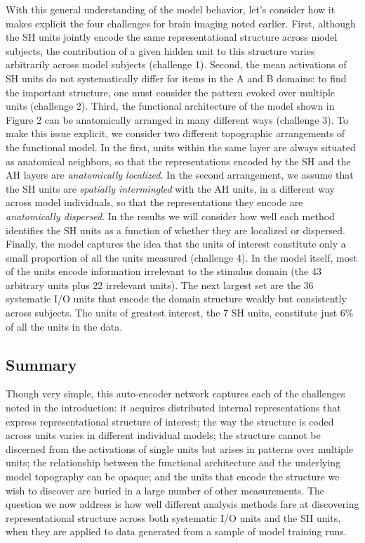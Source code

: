 With this general understanding of the model behavior, let's consider how it makes explicit the four challenges for brain imaging noted earlier. First, although the SH units jointly encode the same representational structure across model subjects, the contribution of a given hidden unit to this structure varies arbitrarily across model subjects (challenge 1). Second, the mean activations of SH units do not systematically differ for items in the A and B domains: to find the important structure, one must consider the pattern evoked over multiple units (challenge 2). Third, the functional architecture of the model shown in Figure 2 can be anatomically arranged in many different ways (challenge 3). To make this issue explicit, we consider two different topographic arrangements of the functional model. In the first, units within the same layer are always situated as anatomical neighbors, so that the representations encoded by the SH and the AH layers are {\em anatomically localized}. In the second arrangement, we assume that the SH units are {\em spatially intermingled} with the AH units, in a different way across model individuals, so that the representations they encode are {\em anatomically dispersed}. In the results we will consider how well each method identifies the SH units as a function of whether they are localized or dispersed. Finally, the model captures the idea that the units of interest constitute only a small proportion of all the units measured (challenge 4). In the model itself, most of the units encode information irrelevant to the stimulus domain (the 43 arbitrary units plus 22 irrelevant units). The next largest set are the 36 systematic I/O units that encode the domain structure weakly but consistently across subjects. The units of greatest interest, the 7 SH units, constitute just 6\% of all the units in the data. 

\subsection{Summary} 

Though very simple, this auto-encoder network captures each of the challenges noted in the introduction: it acquires distributed internal representations that express representational structure of interest; the way the structure is coded across units varies in different individual models; the structure cannot be discerned from the activations of single units but arises in patterns over multiple units; the relationship between the functional architecture and the underlying model topography can be opaque; and the units that encode the structure we wish to discover are buried in a large number of other measurements. The question we now address is how well different analysis methods fare at discovering representational structure across both systematic I/O units and the SH units, when they are applied to data generated from a sample of model training runs.

